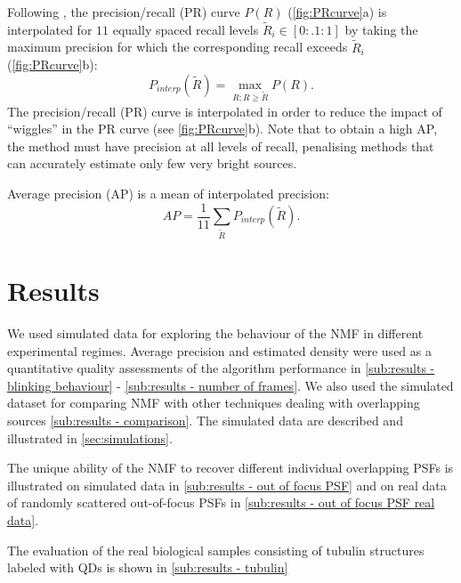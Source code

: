 Following \cite{Everingham2009}, the precision/recall (PR) curve $P(R)$ (\autoref{fig:PRcurve}a) is interpolated for $11$ equally spaced recall levels $\tilde{R}_{i}\in[0:.1:1]$ by taking the maximum precision for which the corresponding recall exceeds $\tilde{R}_{i}$ (\autoref{fig:PRcurve}b):
%
\begin{equation}
	P_{interp}(\tilde{R})=\max_{R;R\geq \tilde{R}}P(R).
\end{equation}
%
The precision/recall (PR) curve is interpolated in order to reduce the impact of ``wiggles'' in the PR curve (see \autoref{fig:PRcurve}b). Note that to obtain a high AP, the method must have precision at all levels of recall, penalising methods that can accurately estimate only few very bright sources. 

Average precision (AP) is a mean of interpolated precision:
%
\begin{equation}
	AP=\frac{1}{11}\sum_{\tilde{R}}{P_{interp}(\tilde{R})}.
	\label{eq:AP}
\end{equation}

\clearpage
\section{Results \label{sec:results}}
We used simulated data for exploring the behaviour of the NMF in different experimental regimes. Average precision and estimated density were used as a quantitative quality assessments of the algorithm performance in  \autoref{sub:results - blinking behaviour} - \ref{sub:results - number of frames}. We also used the simulated dataset for comparing NMF with other techniques dealing with overlapping sources \autoref{sub:results - comparison}. The simulated data are described and illustrated in \autoref{sec:simulations}. 

The unique ability of the NMF to recover different individual overlapping PSFs is illustrated on simulated data in \autoref{sub:results - out of focus PSF} and on real data of randomly scattered out-of-focus PSFs in \autoref{sub:results - out of focus PSF real data}.

The evaluation of the real biological samples consisting of tubulin structures labeled with QDs is shown in \autoref{sub:results - tubulin}


